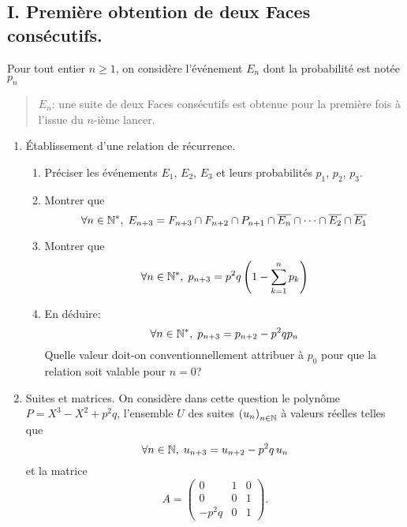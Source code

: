 \subsection*{I. Première obtention de deux Faces consécutifs.}
Pour tout entier $n\geq 1$, on considère l'événement $E_n$ dont la probabilité est notée $p_n$
\begin{quote}
 $E_n$: \og une suite de deux Faces consécutifs est obtenue pour la première fois à l'issue du $n$-ième lancer.\fg
\end{quote}
\begin{enumerate}
 \item \'Etablissement d'une relation de récurrence.
 \begin{enumerate}
 \item Préciser les événements $E_1$, $E_2$, $E_3$ et leurs probabilités $p_1$, $p_2$, $p_3$.
 \item Montrer que 
\begin{displaymath}
\forall n \in \mathbb{N}^*, \;  E_{n+3} = F_{n+3} \cap F_{n+2} \cap P_{n+1} \cap \overline{E_{n}} \cap \cdots \cap \overline{E_{2}} \cap \overline{E_{1}}
\end{displaymath}
 \item Montrer que 
\begin{displaymath}
\forall n \in \mathbb{N}^*, \;  p_{n+3} = p^2 q \left( 1 - \sum_{k=1}^{n}p_k\right) 
\end{displaymath}
 \item En déduire:
\begin{displaymath}
 \forall n\in \mathbb{N}^*, \; p_{n+3} = p_{n+2} - p^2 q p_n
\end{displaymath}
Quelle valeur doit-on conventionnellement attribuer à $p_0$ pour que la relation soit valable pour $n=0$?
\end{enumerate}
\clearpage
 \item Suites et matrices.\newline
On considère dans cette question le polynôme $P = X^3 - X^2 + p^2 q$, l'ensemble $U$ des suites $\left( u_n \right)_{n \in \mathbb{N}}$ à valeurs réelles telles que 
\begin{displaymath}
\forall n\in \mathbb{N}, \; u_{n+3} = u_{n+2} -p^2q\,u_n
\end{displaymath}
et la matrice
\begin{displaymath}
 A = 
 \begin{pmatrix}
0 & 1 & 0 \\ 0 & 0 & 1 \\ -p^2q & 0 & 1  
 \end{pmatrix}
.
\end{displaymath}


\end{enumerate}
